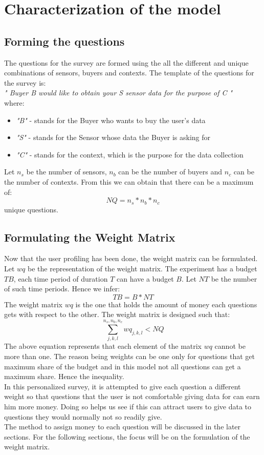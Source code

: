 \section{Characterization of the model}


\subsection{Forming the questions}

The questions for the survey are formed using the all the different and unique combinations of sensors, buyers and contexts. The template of the questions for the survey is:\\
{\it " Buyer B would like to obtain your S sensor data for the purpose of C "}\\
where:
\begin{itemize}
\item {\it "B"} - stands for the Buyer who wants to buy the user's data
\item {\it "S"} - stands for the Sensor whose data the Buyer is asking for
\item {\it "C"} - stands for the context, which is the purpose for the data collection
\end{itemize}

Let $n_s$ be the number of sensors, $n_b$ can be the number of buyers and $n_c$ can be the number of contexts. From this we
can obtain that there can be a maximum of:
$$NQ = n_s*n_b*n_c$$ 
unique questions.

\subsection{Formulating the Weight Matrix}

Now that the user profiling has been done, the weight matrix can be formulated. Let $wq$ be the representation of the weight matrix. The experiment has a budget $TB$, each time period of duration $T$ can
have a budget $B$. Let $NT$ be the number of such time periods. Hence we infer:
$$TB = B*NT$$
The weight matrix $wq$ is the one that holds the amount of money each questions gets with respect to the other. The weight matrix is
designed such that:
$$\sum^{n_s,n_b,n_c}_{j,k,l} wq_{j,k,l} < NQ$$ 
The above equation represents that each element of the matrix $wq$ cannot be more than one. The reason being
weights can be one only for questions that get maximum share of the budget and in this model
not all questions can get a maximum share. Hence the inequality.\\
In this personalized survey, it is attempted to give each question a different
weight so that questions that the user is not comfortable giving data for can earn him more money. Doing so helps us see if this can attract users to give data to questions they would normally not so readily give.\\
The method to assign money to each question will be discussed in the later sections. For the following sections, the focus
will be on the formulation of the weight matrix. 

